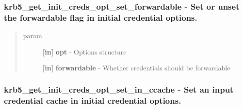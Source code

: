 \documentclass[letterpaper,10pt,english]{sphinxmanual}
\begin{document}
\subsubsection{krb5\_get\_init\_creds\_opt\_set\_forwardable -  Set or unset the forwardable flag in initial credential options.}
\label{appdev/refs/api/krb5_get_init_creds_opt_set_forwardable:krb5-get-init-creds-opt-set-forwardable-set-or-unset-the-forwardable-flag-in-initial-credential-options}\label{appdev/refs/api/krb5_get_init_creds_opt_set_forwardable::doc}

\begin{fulllineitems}
\label{appdev/refs/api/krb5_get_init_creds_opt_set_forwardable:c.krb5_get_init_creds_opt_set_forwardable}
\end{fulllineitems}

\begin{quote}\begin{description}
\item[{param}] \leavevmode
\textbf{{[}in{]}} \textbf{opt} - Options structure

\textbf{{[}in{]}} \textbf{forwardable} - Whether credentials should be forwardable

\end{description}\end{quote}


\subsubsection{krb5\_get\_init\_creds\_opt\_set\_in\_ccache -  Set an input credential cache in initial credential options.}
\label{appdev/refs/api/krb5_get_init_creds_opt_set_in_ccache::doc}\label{appdev/refs/api/krb5_get_init_creds_opt_set_in_ccache:krb5-get-init-creds-opt-set-in-ccache-set-an-input-credential-cache-in-initial-credential-options}

\begin{fulllineitems}
\label{appdev/refs/api/krb5_get_init_creds_opt_set_in_ccache:c.krb5_get_init_creds_opt_set_in_ccache}
\end{fulllineitems}
\end{document}
